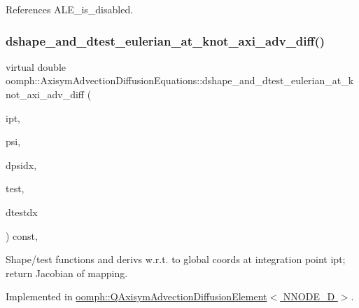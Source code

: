 References A\+L\+E\+\_\+is\+\_\+disabled.

\mbox{\label{classoomph_1_1AxisymAdvectionDiffusionEquations_a6d844cf194aa8fa462bbfcda811b24ca}} 
\subsubsection{\texorpdfstring{dshape\+\_\+and\+\_\+dtest\+\_\+eulerian\+\_\+at\+\_\+knot\+\_\+axi\+\_\+adv\+\_\+diff()}{dshape\_and\_dtest\_eulerian\_at\_knot\_axi\_adv\_diff()}}
{\footnotesize\ttfamily virtual double oomph\+::\+Axisym\+Advection\+Diffusion\+Equations\+::dshape\+\_\+and\+\_\+dtest\+\_\+eulerian\+\_\+at\+\_\+knot\+\_\+axi\+\_\+adv\+\_\+diff (\begin{DoxyParamCaption}\item[{const unsigned \&}]{ipt,  }\item[{\hyperlink{classoomph_1_1Shape}{Shape} \&}]{psi,  }\item[{\hyperlink{classoomph_1_1DShape}{D\+Shape} \&}]{dpsidx,  }\item[{\hyperlink{classoomph_1_1Shape}{Shape} \&}]{test,  }\item[{\hyperlink{classoomph_1_1DShape}{D\+Shape} \&}]{dtestdx }\end{DoxyParamCaption}) const\hspace{0.3cm}{\ttfamily [protected]}, {}}



Shape/test functions and derivs w.\+r.\+t. to global coords at integration point ipt; return Jacobian of mapping. 



Implemented in \hyperlink{classoomph_1_1QAxisymAdvectionDiffusionElement_a4bb026009c2c69e6870ff45450382418}{oomph\+::\+Q\+Axisym\+Advection\+Diffusion\+Element$<$ N\+N\+O\+D\+E\+\_\+D $>$}.



